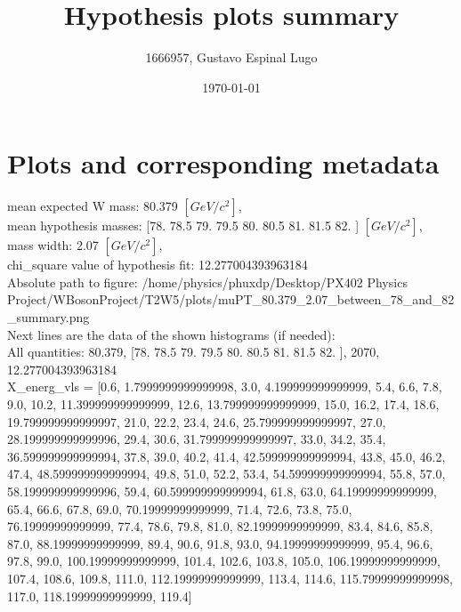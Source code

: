 \documentclass[12pt]{article}
\begin{document}
	\title{Hypothesis plots summary} %
	\author{1666957, Gustavo Espinal Lugo}
	\date{\today} %

	\maketitle
	
	\section*{Plots and corresponding metadata}
	mean expected W mass: 80.379 $[GeV/c^{2}]$,\\
mean hypothesis masses: [78.  78.5 79.  79.5 80.  80.5 81.  81.5 82. ] $[GeV/c^{2}]$,\\
mass width: 2.07 $[GeV/c^{2}]$,\\
chi\_square value of hypothesis fit: 12.277004393963184\\
	Absolute path to figure: /home/physics/phuxdp/Desktop/PX402 Physics Project/WBosonProject/T2W5/plots/muPT\_80.379\_2.07\_between\_78\_and\_82\_summary.png\\
	Next lines are the data of the shown histograms (if needed): \\
	All quantities: 	80.379, [78.  78.5 79.  79.5 80.  80.5 81.  81.5 82. ], 2070, 12.277004393963184\\
	X\_energ\_vls = [0.6, 1.7999999999999998, 3.0, 4.199999999999999, 5.4, 6.6, 7.8, 9.0, 10.2, 11.399999999999999, 12.6, 13.799999999999999, 15.0, 16.2, 17.4, 18.6, 19.799999999999997, 21.0, 22.2, 23.4, 24.6, 25.799999999999997, 27.0, 28.199999999999996, 29.4, 30.6, 31.799999999999997, 33.0, 34.2, 35.4, 36.599999999999994, 37.8, 39.0, 40.2, 41.4, 42.599999999999994, 43.8, 45.0, 46.2, 47.4, 48.599999999999994, 49.8, 51.0, 52.2, 53.4, 54.599999999999994, 55.8, 57.0, 58.199999999999996, 59.4, 60.599999999999994, 61.8, 63.0, 64.19999999999999, 65.4, 66.6, 67.8, 69.0, 70.19999999999999, 71.4, 72.6, 73.8, 75.0, 76.19999999999999, 77.4, 78.6, 79.8, 81.0, 82.19999999999999, 83.4, 84.6, 85.8, 87.0, 88.19999999999999, 89.4, 90.6, 91.8, 93.0, 94.19999999999999, 95.4, 96.6, 97.8, 99.0, 100.19999999999999, 101.4, 102.6, 103.8, 105.0, 106.19999999999999, 107.4, 108.6, 109.8, 111.0, 112.19999999999999, 113.4, 114.6, 115.79999999999998, 117.0, 118.19999999999999, 119.4]\\
\end{document}
